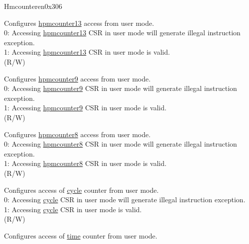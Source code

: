 \begin{register}{H}{mcounteren}{0x306}\label{regdesc:MCOUNTEREN}
%
%
%
%
%
%
%
%
%
\regnewline%
\begin{regdesc}\begin{reglist}
\label{fielddesc:MCOUNTEREN_HPM_13}\item [{HPM13}] Configures \hyperref[regdesc:HPMCOUNTER13] {hpmcounter13} access from user mode.\\
0: Accessing \hyperref[regdesc:HPMCOUNTER13] {hpmcounter13} CSR in user mode will generate illegal instruction exception. \\
1: Accessing \hyperref[regdesc:HPMCOUNTER13] {hpmcounter13} CSR in user mode is valid. \\
(R/W)
\label{fielddesc:MCOUNTEREN_HPM9}\item [{HPM9}] Configures \hyperref[regdesc:HPMCOUNTER9] {hpmcounter9} access from user mode.\\
0: Accessing \hyperref[regdesc:HPMCOUNTER9] {hpmcounter9} CSR in user mode will generate illegal instruction exception. \\
1: Accessing \hyperref[regdesc:HPMCOUNTER13] {hpmcounter9} CSR in user mode is valid. \\
(R/W)
\label{fielddesc:MCOUNTEREN_HPM_8}\item [{HPM8}] Configures \hyperref[regdesc:HPMCOUNTER13] {hpmcounter8} access from user mode.\\
0: Accessing \hyperref[regdesc:HPMCOUNTER13] {hpmcounter8} CSR in user mode will generate illegal instruction exception. \\
1: Accessing \hyperref[regdesc:HPMCOUNTER8] {hpmcounter8} CSR in user mode is valid. \\
(R/W)
\label{fielddesc:MCOUNTEREN_CY}\item [CY] Configures access of \hyperref[regdesc:CYCLE]{cycle} counter from user mode. \\
0: Accessing \hyperref[regdesc:CYCLE]{cycle} CSR in user mode will generate illegal instruction exception. \\
1: Accessing \hyperref[regdesc:CYCLE]{cycle} CSR in user mode is valid. \\
(R/W)
\label{fielddesc:MCOUNTEREN_TM}\item [TM] Configures access of \hyperref[regdesc:TIME]{time} counter from user mode. \\

\end{reglist}
\end{regdesc}
\end{register}
